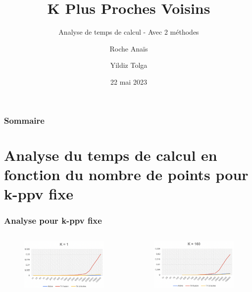 \documentclass{beamer}
\title {K Plus Proches Voisins}
\subtitle{Analyse de temps de calcul - Avec 2 méthodes}
\author{Roche Anaïs \and Yildiz Tolga}
\date {22 mai 2023}
\begin{document}
\frame{\titlepage}

\begin{frame}
\frametitle{Sommaire}
\tableofcontents
\end{frame}

\section{Analyse du temps de calcul en fonction du nombre de points pour k-ppv fixe}

\begin{frame}
\frametitle{Analyse pour k-ppv fixe}
\begin{columns}
    \begin{figure}
      \includegraphics[width=\textwidth]{Beamer/K_1.png}
    \end{figure}

    \begin{figure}
      \includegraphics[width=\textwidth]{Beamer/K_160.png}
    \end{figure}
\end{columns}


\end{frame}
\end{document}
